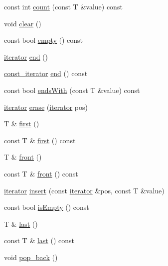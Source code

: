 \begin{DoxyCompactItemize}
\item 
const int \hyperlink{classprism_1_1_list_a3e274e926be4ac7664e8b1ba79cf3db9}{count} (const T \&value) const 
\item 
void \hyperlink{classprism_1_1_list_af51ed8f35ae20cc4639962a2dead76d3}{clear} ()
\item 
const bool \hyperlink{classprism_1_1_list_a8d58db1d27cc01ce3036d448f232ced4}{empty} () const 
\item 
\hyperlink{classprism_1_1_list_a6cf00c98a428ed325fe9ccc60d7ef95a}{iterator} \hyperlink{classprism_1_1_list_a47ef0b3d04fa49bd05f00a13bdfb2b93}{end} ()
\item 
\hyperlink{classprism_1_1_list_a038bd36af263a85110467528db8305d5}{const\+\_\+iterator} \hyperlink{classprism_1_1_list_acaa7fffb63e4f955b0f77cf9899c924c}{end} () const 
\item 
const bool \hyperlink{classprism_1_1_list_a8575a0221bf51275ac186406d656a4f3}{ends\+With} (const T \&value) const 
\item 
\hyperlink{classprism_1_1_list_a6cf00c98a428ed325fe9ccc60d7ef95a}{iterator} \hyperlink{classprism_1_1_list_ab6440bbb53502f6e689c1c9274ffa6f8}{erase} (\hyperlink{classprism_1_1_list_a6cf00c98a428ed325fe9ccc60d7ef95a}{iterator} pos)
\item 
T \& \hyperlink{classprism_1_1_list_a5c20cbafe00fff084b1c48016a0b04f8}{first} ()
\item 
const T \& \hyperlink{classprism_1_1_list_a2ff7747c0784e8f8f71a9365a241601e}{first} () const 
\item 
T \& \hyperlink{classprism_1_1_list_a64abe6201e00a727d55299242b0f5aee}{front} ()
\item 
const T \& \hyperlink{classprism_1_1_list_a5319d6f066eaa794399d36177275f800}{front} () const 
\item 
\hyperlink{classprism_1_1_list_a6cf00c98a428ed325fe9ccc60d7ef95a}{iterator} \hyperlink{classprism_1_1_list_a94237ea84df5f1e804ab6ff2717a5634}{insert} (const \hyperlink{classprism_1_1_list_a6cf00c98a428ed325fe9ccc60d7ef95a}{iterator} \&pos, const T \&value)
\item 
const bool \hyperlink{classprism_1_1_list_ac0f60893564ab12f9c9974ba685db2b0}{is\+Empty} () const 
\item 
T \& \hyperlink{classprism_1_1_list_a16681bef913b82d9951330c7526cdb3f}{last} ()
\item 
const T \& \hyperlink{classprism_1_1_list_acf84da5c22f8fe60c182de1f29171ea1}{last} () const 
\item 
void \hyperlink{classprism_1_1_list_aac8b29572cd691890a82846b35799e36}{pop\+\_\+back} ()

\end{DoxyCompactItemize}
